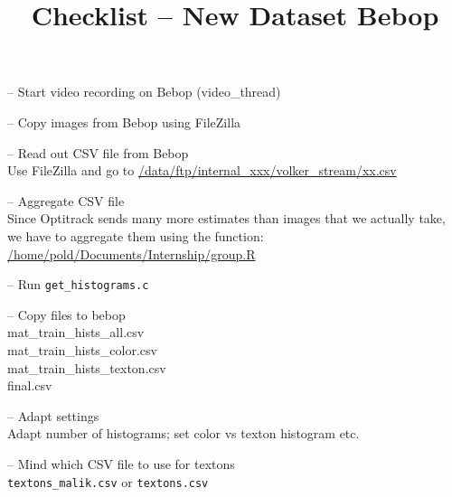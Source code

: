\documentclass{article}
\title{Checklist -- New Dataset Bebop}
\date{}
\let\oldmarginpar\marginpar
\renewcommand\marginpar[1]{\-\oldmarginpar[\raggedleft #1]%
{\raggedright #1}}
\newenvironment{checklist}{%
  \begin{list}{}{}%
  \let\olditem\item
  \renewcommand\item{\olditem -- \marginpar{$\Box$} }
  \newcommand\checkeditem{\olditem -- \marginpar{$\CheckedBox$} }
}{%
  \end{list}
}
\begin{document}
\maketitle

\begin{checklist}
\item Start video recording on Bebop (video\_thread)
\item Copy images from Bebop using FileZilla
\item Read out CSV file from Bebop\\
 Use FileZilla and go to
 \url{/data/ftp/internal_xxx/volker_stream/xx.csv}
\item Aggregate CSV file\\
Since Optitrack sends many more estimates than images that we actually
take, we have to aggregate them using the function:\\
\url{/home/pold/Documents/Internship/group.R}
\item Run \texttt{get\_histograms.c}
\item Copy files to bebop\\
  mat\_train\_hists\_all.csv\\
  mat\_train\_hists\_color.csv\\
  mat\_train\_hists\_texton.csv\\
  final.csv\\
\item Adapt settings\\
Adapt number of histograms; set color vs texton histogram etc.
\item Mind which CSV file to use for textons\\
  \texttt{textons\_malik.csv} or \texttt{textons.csv}
\end{checklist}
\end{document}
